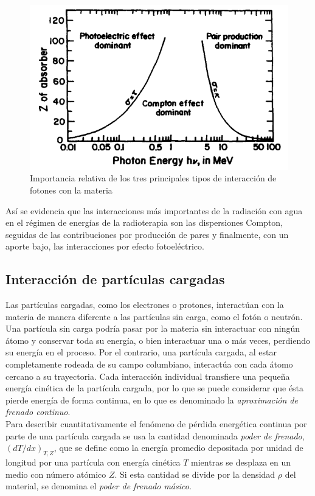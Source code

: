 \begin{figure}[H]
	\centering
	\includegraphics[width=0.7\linewidth]{images/importanciaRelativa.png}
	\caption{Importancia relativa de los tres principales tipos de interacción de fotones con la materia \cite{Attix1986}}
	\label{fig:importanciaRelativa}
\end{figure}

Así se evidencia que las interacciones más importantes de la radiación con agua en el régimen de energías de la radioterapia son las dispersiones Compton, seguidas de las contribuciones por producción de pares y finalmente, con un aporte bajo, las interacciones por efecto fotoeléctrico.  \\

\subsection{Interacción de partículas cargadas}

Las partículas cargadas, como los electrones o protones, interactúan con la materia de manera diferente a las partículas sin carga, como el fotón o neutrón. Una partícula sin carga podría pasar por la materia sin interactuar con ningún átomo y conservar toda su energía, o bien interactuar una o más veces, perdiendo su energía en el proceso. Por el contrario, una partícula cargada, al estar completamente rodeada de su campo columbiano, interactúa con cada átomo cercano a su trayectoria. Cada interacción individual transfiere una pequeña energía cinética de la partícula cargada, por lo que se puede considerar que ésta pierde energía de forma continua, en lo que es denominado la \textit{aproximación de frenado continuo}.\\

Para describir cuantitativamente el fenómeno de pérdida energética continua por parte de una partícula cargada se usa la cantidad denominada \textit{poder de frenado}, $(dT/dx)_{T,Z}$, que se define como la energía promedio depositada por unidad de longitud por una partícula con energía cinética $T$ mientras se desplaza en un medio con número atómico $Z$. Si esta cantidad se divide por la densidad $\rho$ del material, se denomina el \textit{poder de frenado másico}.\\

